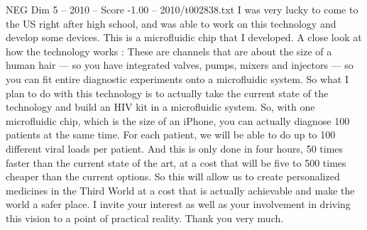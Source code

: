 \begin{textsample}{NEG Dim 5 – 2010 – Score -1.00 – 2010/t002838.txt}
I was very lucky to come to the US right after high school, and was able to work on this technology and develop some devices.
This is a microfluidic chip that I developed.
A close look at how the technology works : These are channels that are about the size of a human hair — so you have integrated valves, pumps, mixers and injectors — so you can fit entire diagnostic experiments onto a microfluidic system.
So what I plan to do with this technology is to actually take the current state of the technology and build an HIV kit in a microfluidic system.
So, with one microfluidic chip, which is the size of an iPhone, you can actually diagnose 100 patients at the same time.
For each patient, we will be able to do up to 100 different viral loads per patient.
And this is only done in four hours, 50 times faster than the current state of the art, at a cost that will be five to 500 times cheaper than the current options.
So this will allow us to create personalized medicines in the Third World at a cost that is actually achievable and make the world a safer place.
I invite your interest as well as your involvement in driving this vision to a point of practical reality.
Thank you very much.

\end{textsample}
